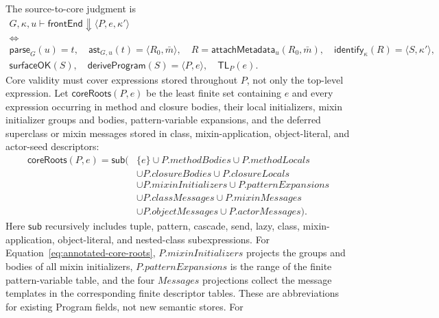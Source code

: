 The source-to-core judgment is
\begin{equation}\label{eq:source-to-annotated-core}
 \begin{gathered}
 G,\kappa,u\vdash\mathsf{frontEnd}\Downarrow
   \langle P,e,\kappa'\rangle\\[-1mm]
 \Longleftrightarrow\\[-1mm]
  \mathsf{parse}_{G}(u)=t,\quad
  \mathsf{ast}_{G,u}(t)=\langle R_0,\bar m\rangle,\quad
  R=\mathsf{attachMetadata}_{u}(R_0,\bar m),\quad
  \mathsf{identify}_{\kappa}(R)=\langle S,\kappa'\rangle,\\
  \mathsf{surfaceOK}(S),\quad
  \mathsf{deriveProgram}(S)=\langle P,e\rangle,\quad
  \mathsf{TL}_{P}(e).
 \end{gathered}
\end{equation}
Core validity must cover expressions stored throughout $P$, not only the
top-level expression.  Let $\mathsf{coreRoots}(P,e)$ be the least finite set
containing $e$ and every expression occurring in method and closure bodies,
their local initializers, mixin initializer groups and bodies, pattern-variable
expansions, and the deferred superclass or mixin messages stored in class,
mixin-application, object-literal, and actor-seed descriptors:
\begin{equation}\label{eq:annotated-core-roots}
\begin{split}
 \mathsf{coreRoots}(P,e)=\mathsf{sub}\bigl(&\{e\}
   \cup P.\mathit{methodBodies}\cup P.\mathit{methodLocals}\\
 &\cup P.\mathit{closureBodies}\cup P.\mathit{closureLocals}\\
 &\cup P.\mathit{mixinInitializers}\cup P.\mathit{patternExpansions}\\
 &\cup P.\mathit{classMessages}\cup P.\mathit{mixinMessages}\\
 &\cup P.\mathit{objectMessages}\cup P.\mathit{actorMessages}\bigr).
\end{split}
\end{equation}
Here $\mathsf{sub}$ recursively includes tuple, pattern, cascade, send, lazy,
class, mixin-application, object-literal, and nested-class subexpressions.  For
Equation~\eqref{eq:annotated-core-roots}, $P.\mathit{mixinInitializers}$
projects the groups and bodies of all mixin initializers,
$P.\mathit{patternExpansions}$ is the range of the finite pattern-variable
table, and the four $\mathit{Messages}$ projections collect the message
templates in the corresponding finite descriptor tables.  These are
abbreviations for existing Program fields, not new semantic stores.  For
